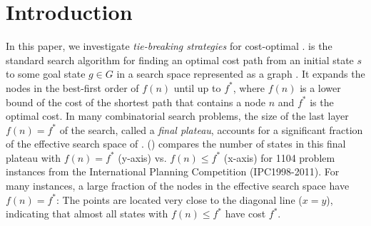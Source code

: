 
\section{Introduction}
\label{sec:introduction}

In this paper, we investigate \emph{tie-breaking strategies} for cost-optimal \astar.
\astar is the standard search algorithm for finding an optimal cost path from an initial state $s$ to some goal
state $g \in G$ in a search space represented as a graph \cite{hart1968formal}.
It expands the nodes in the best-first order of $f(n)$ until up to $f^*$,
where $f(n)$ is a lower bound of the cost of the shortest path that contains a node $n$ and $f^*$ is the optimal cost.
% 
In many combinatorial search problems, the size of the last layer $f(n)=f^*$ of the search, called a \emph{final plateau},
accounts for a significant fraction of the effective search space of \astar.  
() compares the number of states in this final plateau with $f(n) = f^*$ (y-axis)
vs. $f(n) \leq f^*$ (x-axis) for 1104 problem instances from the International Planning Competition (IPC1998-2011).
For many instances, a large fraction of the nodes in the effective search space have $f(n)=f^*$: The points
are located very close to the diagonal line ($x=y$), indicating that almost all states with $f(n) \leq f^*$ have cost
$f^*$.


